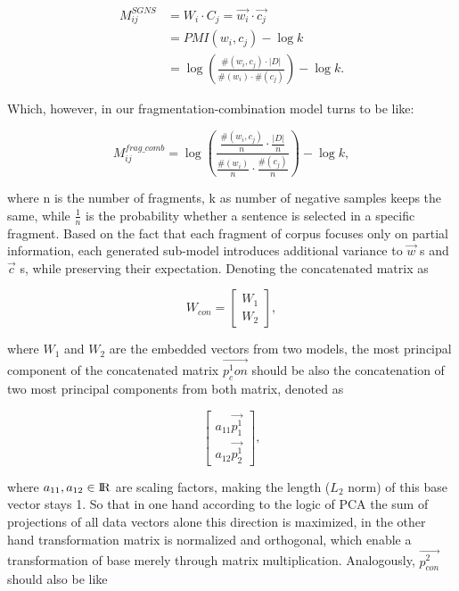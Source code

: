   \begin{equation}
  \begin{split}
  M^{SGNS}_{ij} &= W_i\cdot C_j = \vec{w_i}\cdot\vec{c_j}\\
                &= PMI(w_i, c_j) - \log k\\
                &= \log {(\frac{\#(w_i,c_j)\cdot|D|}{\#(w_i)\cdot\#(c_j)})} - \log k.
  \end{split}
  \end{equation}

  Which, however, in our fragmentation-combination model turns to be like:

  \begin{equation}
  M^{frag\_comb}_{ij} = \log (\frac{{\frac{\#(w_i,c_j)}{n}}\cdot{\frac{|D|}{n}}} {{\frac{\#(w_i)}{n}}\cdot{\frac{\#(c_j)}{n}}}) - \log k,
  \end{equation}

  where n is the number of fragments, k as number of negative samples keeps the same, while $\frac{1}{n}$ is the probability whether a sentence is selected in a specific fragment. Based on the fact that each fragment of corpus focuses only on partial information, each generated sub-model introduces additional variance to $\vec{w}$ s and $\vec{c}$ s, while preserving their expectation. Denoting the concatenated matrix as

  \[W_{con}=\begin{bmatrix}
    W_1\\
    W_2\end{bmatrix},\]

  where $W_1$ and $W_2$ are the embedded vectors from two models, the most principal component of the concatenated matrix $\vec{p^1_con}$ should be also the concatenation of two most principal components from both matrix, denoted as 

  \[\begin{bmatrix}
  a_{11}\vec{p^1_1}\\
  a_{12}\vec{p^1_2}
  \end{bmatrix},\] 

  where $a_{11}, a_{12}\in{\rm I\!R}$ are scaling factors, making the length ($L_2$ norm) of this base vector stays 1. So that in one hand according to the logic of PCA the sum of projections of all data vectors alone this direction is maximized, in the other hand transformation matrix is normalized and orthogonal, which enable a transformation of base merely through matrix multiplication. Analogously, $\vec{p^2_{con}}$ should also be like

